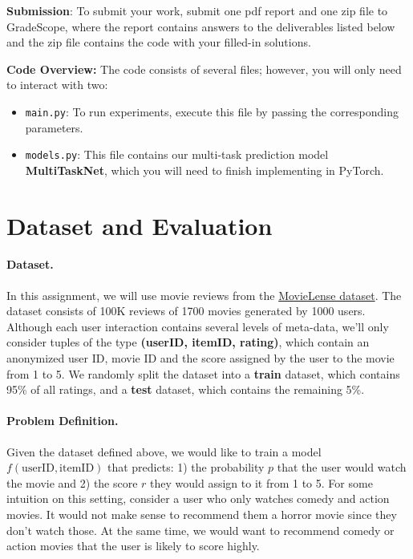 \documentclass[12pt]{article}
\begin{document}
    \noindent\textbf{Submission}: To submit your work, submit one pdf report and one zip file to GradeScope, where the report contains answers to the deliverables listed below and the zip file contains the code with your filled-in solutions.

    \vspace{0.2cm}

    \noindent\textbf{Code Overview:} The code consists of several files; however, you will only need to interact with two:

    \begin{itemize}
        \item \texttt{main.py}: To run experiments, execute this file by passing the corresponding parameters.
        \item \texttt{models.py}: This file contains our multi-task prediction model \textbf{MultiTaskNet}, which you will need to finish implementing in PyTorch.
    \end{itemize}


    \section{Dataset and Evaluation}

    \paragraph{Dataset.} In this assignment, we will use movie reviews from the \href{https://grouplens.org/datasets/movielens/100k}{MovieLense dataset}. The dataset consists of 100K reviews of 1700 movies generated by 1000 users. Although each user interaction contains several levels of meta-data, we'll only consider tuples of the type \textbf{(userID, itemID, rating)}, which contain an anonymized user ID, movie ID and the score assigned by the user to the movie from 1 to 5. We randomly split the dataset into a \textbf{train} dataset, which contains 95\% of all ratings, and a \textbf{test} dataset, which contains the remaining 5\%.

    \paragraph{Problem Definition.}
    Given the dataset defined above, we would like to train a model $f(\text{userID}, \text{itemID})$ that predicts: 1) the probability $p$ that the user would watch the movie and 2) the score $r$ they would assign to it from 1 to 5. For some intuition on this setting, consider a user who only watches comedy and action movies. It would not make sense to recommend them a horror movie since they don't watch those. At the same time, we would want to recommend comedy or action movies that the user is likely to score highly.
\end{document}
